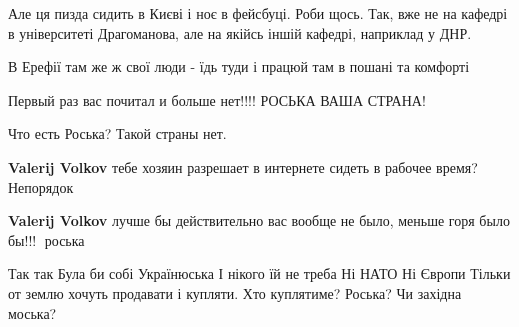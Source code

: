\begin{itemize}
\begin{itemize}
Але ця пизда сидить в Києві і ноє в фейсбуці. Роби щось. Так, вже не на кафедрі
в університеті Драгоманова, але на якійсь іншій кафедрі, наприклад у ДНР.

В Ерефії там же ж свої люди - їдь туди і працюй там в пошані та комфорті
\end{itemize}

 
Первый раз вас почитал и больше нет!!!! РОСЬКА ВАША СТРАНА!

\begin{itemize}
 
Что есть Роська?
Такой страны нет.

 
\textbf{Valerij Volkov} тебе хозяин разрешает в интернете сидеть в рабочее время? Непорядок

 
\textbf{Valerij Volkov} лучше бы действительно вас вообще не было, меньше горя было бы!!! 👹роська

 
\obeycr
Так так
Була би собі Українюська
І нікого їй не треба
Ні НАТО
Ні Європи
Тільки от землю хочуть продавати і купляти.
Хто куплятиме?
Роська?
Чи західна моська?
\restorecr

 

\end{itemize}
\end{itemize}
